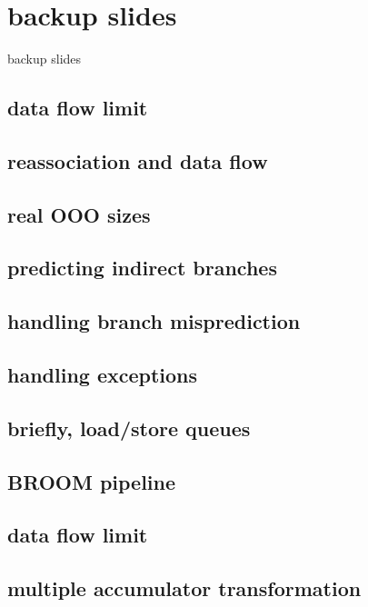 
\section{backup slides}
\begin{frame}{backup slides}
\end{frame}

\subsection{data flow limit}


\subsection{reassociation and data flow}


\subsection{real OOO sizes}



\subsection{predicting indirect branches}



\subsection{handling branch misprediction}


\subsection{handling exceptions}
 

\subsection{briefly, load/store queues}

\subsection{BROOM pipeline}

\subsection{data flow limit}


\subsection{multiple accumulator transformation}

